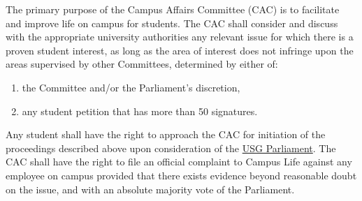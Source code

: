 \label{CACByLawsdef}

\begin{parenum}
\item The primary purpose of the Campus Affairs Committee (CAC)  is to facilitate and improve life on campus for students. The CAC shall consider and discuss with the appropriate university authorities any relevant issue for which there is a proven student interest, as long as the area of interest does not infringe upon the areas supervised by other Committees, determined by either of:
\begin{enumerate}
\item the Committee and/or the Parliament's discretion,
\item any student petition that has more than 50 signatures.
\end{enumerate}

\item Any student shall have the right to approach the CAC for initiation of the proceedings described above upon consideration of the \hyperref[USGParliamentDef]{USG Parliament}.
The CAC shall have the right to file an official complaint to Campus Life against any employee on campus provided that there exists evidence beyond reasonable doubt on the issue, and with an absolute majority vote of the Parliament.

\item {}
\end{parenum}




